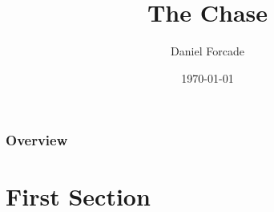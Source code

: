 \documentclass[12pt]{beamer}\usepackage[]{graphicx}\usepackage[]{color}
\title[The Long Road]{The Chase} %
\author{Daniel Forcade} %
\institute[UVM] %
{
University of Vermont \\ %
\medskip
\textit{daniel.forcade@uvm.edu} %
}
\date{\today} %
\begin{document}
{
%
\begin{frame}

\titlepage %

\end{frame}
}




\begin{frame}
\frametitle{Overview} %
\tableofcontents %
\end{frame}

\section{First Section} %
\end{document}
